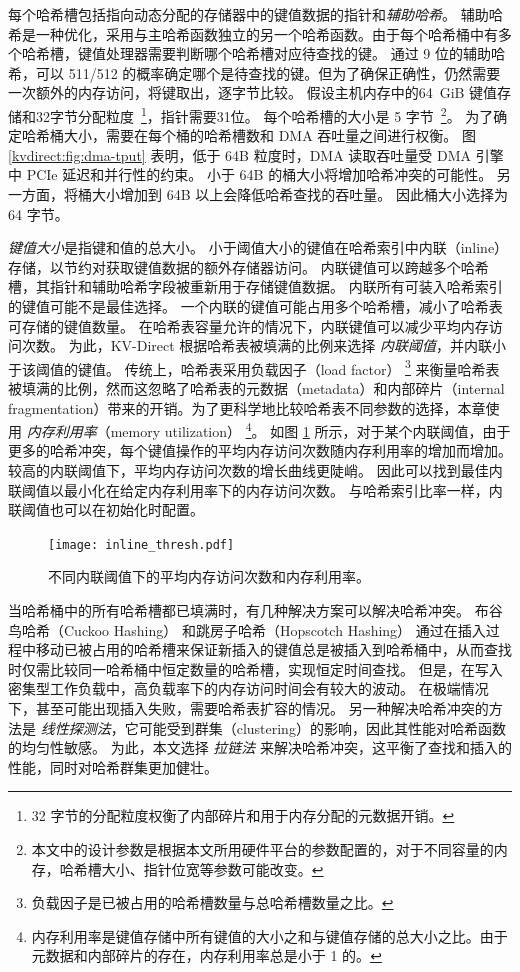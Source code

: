 每个哈希槽包括指向动态分配的存储器中的键值数据的指针和\textit{辅助哈希}。
辅助哈希是一种优化，采用与主哈希函数独立的另一个哈希函数。由于每个哈希桶中有多个哈希槽，键值处理器需要判断哪个哈希槽对应待查找的键。
通过 9 位的辅助哈希，可以 511/512 的概率确定哪个是待查找的键。但为了确保正确性，仍然需要一次额外的内存访问，将键取出，逐字节比较。
假设主机内存中的64~GiB 键值存储和32字节分配粒度~\footnote{32 字节的分配粒度权衡了内部碎片和用于内存分配的元数据开销。}，指针需要31位。
每个哈希槽的大小是 5 字节~\footnote{本文中的设计参数是根据本文所用硬件平台的参数配置的，对于不同容量的内存，哈希槽大小、指针位宽等参数可能改变。}。
为了确定哈希桶大小，需要在每个桶的哈希槽数和 DMA 吞吐量之间进行权衡。
图 \ref {kvdirect:fig:dma-tput} 表明，低于 64B 粒度时，DMA 读取吞吐量受 DMA 引擎中 PCIe 延迟和并行性的约束。
小于 64B 的桶大小将增加哈希冲突的可能性。
另一方面，将桶大小增加到 64B 以上会降低哈希查找的吞吐量。
因此桶大小选择为 64 字节。

\textit {键值大小}是指键和值的总大小。
小于阈值大小的键值在哈希索引中内联（inline）存储，以节约对获取键值数据的额外存储器访问。
内联键值可以跨越多个哈希槽，其指针和辅助哈希字段被重新用于存储键值数据。
内联所有可装入哈希索引的键值可能不是最佳选择。
一个内联的键值可能占用多个哈希槽，减小了哈希表可存储的键值数量。
在哈希表容量允许的情况下，内联键值可以减少平均内存访问次数。
为此，KV-Direct 根据哈希表被填满的比例来选择 \textit {内联阈值}，并内联小于该阈值的键值。
传统上，哈希表采用负载因子（load factor） \footnote{负载因子是已被占用的哈希槽数量与总哈希槽数量之比。} 来衡量哈希表被填满的比例，然而这忽略了哈希表的元数据（metadata）和内部碎片（internal fragmentation）带来的开销。为了更科学地比较哈希表不同参数的选择，本章使用 \textit {内存利用率}（memory utilization） \footnote{内存利用率是键值存储中所有键值的大小之和与键值存储的总大小之比。由于元数据和内部碎片的存在，内存利用率总是小于 1 的。}。
如图 \ref {kvdirect:fig:inline-offline} 所示，对于某个内联阈值，由于更多的哈希冲突，每个键值操作的平均内存访问次数随内存利用率的增加而增加。
较高的内联阈值下，平均内存访问次数的增长曲线更陡峭。
因此可以找到最佳内联阈值以最小化在给定内存利用率下的内存访问次数。
与哈希索引比率一样，内联阈值也可以在初始化时配置。


\begin{figure}[htbp]
	\centering
	\texttt{[image: inline\_thresh.pdf]}
	\caption{不同内联阈值下的平均内存访问次数和内存利用率。}
	\label{kvdirect:fig:inline-offline}
\end{figure}


当哈希桶中的所有哈希槽都已填满时，有几种解决方案可以解决哈希冲突。
布谷鸟哈希（Cuckoo Hashing）\cite {pagh2004cuckoo} 和跳房子哈希（Hopscotch Hashing）\cite {herlihy2008hopscotch} 通过在插入过程中移动已被占用的哈希槽来保证新插入的键值总是被插入到哈希桶中，从而查找时仅需比较同一哈希桶中恒定数量的哈希槽，实现恒定时间查找。
但是，在写入密集型工作负载中，高负载率下的内存访问时间会有较大的波动。
在极端情况下，甚至可能出现插入失败，需要哈希表扩容的情况。
另一种解决哈希冲突的方法是 \textit{线性探测法}，它可能受到群集（clustering）的影响，因此其性能对哈希函数的均匀性敏感。
为此，本文选择 \textit {拉链法} 来解决哈希冲突，这平衡了查找和插入的性能，同时对哈希群集更加健壮。

